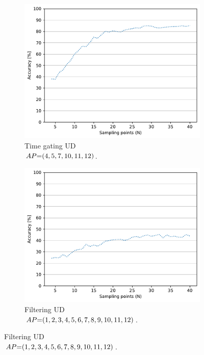\begin{figure}[ht]
  \begin{subfigure}{.49\textwidth}
    \centering
    \includegraphics[width=.99\linewidth]{Figures/RadarExperiments/Datasets/ThroughMaterials/PVC/samples-timegating-ud.pdf}
    \vspace{-15pt}
    \captionsetup{width=.99\linewidth}
    \caption{Time gating UD \\ $\splitatcommas{AP{=}(4, 5, 7, 10, 11, 12)}$.}
    \label{fig:radar-experiments:through-materials:pvc-samples:timegating-ud}
  \end{subfigure}
  \begin{subfigure}{.49\textwidth}
    \centering
    \includegraphics[width=.99\linewidth]{Figures/RadarExperiments/Datasets/ThroughMaterials/PVC/samples-filtering-ud.pdf}  
    \vspace{-15pt}
    \captionsetup{width=.99\linewidth}
    \caption{Filtering UD \\ $\splitatcommas{AP{=}(1, 2, 3, 4, 5, 6, 7, 8, 9, 10, 11, 12)}$.}
    \label{fig:radar-experiments:through-materials:pvc-samples:filtering-ud}
  \end{subfigure}


\end{figure}
